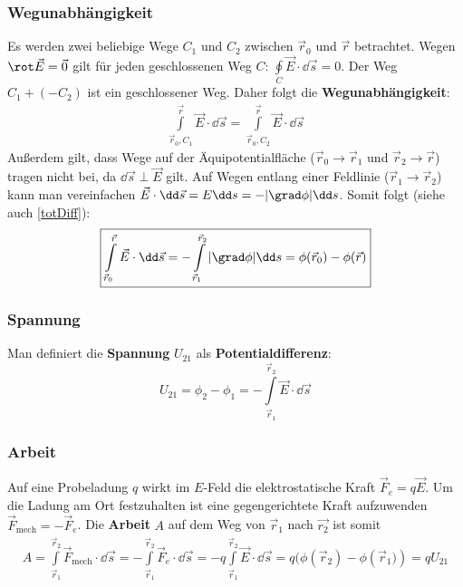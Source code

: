 	  \subsubsection{Wegunabhängigkeit}
		  
			   Es werden zwei beliebige Wege $C_1$ und $C_2$ zwischen
			        $\vec{r} _0$ und $\vec{r} $ betrachtet.
			   Wegen $\rot \vec{E} =\vec{0} $ gilt für jeden geschlossenen
			        Weg $C$:
			        $
				        \oint\limits_C \vec{E}\cdot\dd\vec{s} = 0
			        $.
			   Der Weg $C_1 + (-C_2)$ ist ein geschlossener Weg. Daher
			        folgt die \textbf{Wegunabhängigkeit}:
			        \begin{equation}\begin{split}
					        \boxed{\int\limits_{\vec{r} _0, C_1}^{\vec{r} } \vec{E}\cdot\dd\vec{s} =        \int\limits_{\vec{r} _0, C_2}^{\vec{r} } \vec{E}\cdot\dd\vec{s}}
				        \end{split}\end{equation}
			   Außerdem gilt, dass Wege auf der Äquipotentialfläche ($\vec{r} _0\to\vec{r} _1$ und
			        $\vec{r} _2\to\vec{r} $) tragen nicht bei, da $\dd\vec{s}
				        \perp \vec{E}$ gilt.
			   Auf Wegen entlang einer Feldlinie ($\vec{r} _1\to\vec{r} _2$) kann man vereinfachen
			        $\vec{E}\cdot\dd\vec{s} = E \dd s = -|\grad \phi| \dd s$.
			   Somit folgt (siehe auch \ref{totDiff}):
			        \begin{equation}\begin{split}
					        \boxed{\int\limits_{\vec{r} _0}^{\vec{r} } \vec{E}\cdot\dd\vec{s} =
						        -
						        \int\limits_{\vec{r} _1}^{\vec{r} _2}
						        |\grad \phi|\dd
						        s
						        =
						        \phi(\vec{r} _0)
						        - \phi(\vec{r} )}
				        \end{split}\end{equation}
	  \subsubsection{Spannung}
		  Man definiert die
		  \textbf{Spannung} $U_{21}$ als \textbf{Potentialdifferenz}:
		  $$
			  U_{21} = \phi_2 - \phi_1 = - \int\limits_{\vec{r} _1}^{\vec{r} _2}
			  \vec{E}\cdot \dd \vec{s}
		  $$
	  \subsubsection{Arbeit}
		  Auf eine Probeladung $q$ wirkt im $E$-Feld die elektrostatische
		  Kraft $\vec{F}_e = q\vec{E}$. Um die Ladung am Ort
		  festzuhalten ist eine gegengerichtete Kraft aufzuwenden
		  $\vec{F}_\text{mech} = -\vec{F}_e$. Die \textbf{Arbeit} $A$
		  auf dem Weg von $\vec{r} _1$ nach $\vec{r_2}$ ist somit
		  \begin{equation}\begin{split}
				  A = \int\limits_{\vec{r} _1}^{\vec{r} _2}
				  \vec{F}_\text{mech}\cdot\dd\vec{s} = - \int\limits_{\vec{r} _1}^{\vec{r} _2}
				  \vec{F}_e\cdot\dd\vec{s} = -q\int\limits_{\vec{r} _1}^{\vec{r} _2}
				  \vec{E}\cdot\dd\vec{s} = q (\phi(\vec{r} _2)-\phi({\vec{r} _1)})
				  = q U_{21}
			  \end{split}\end{equation}
